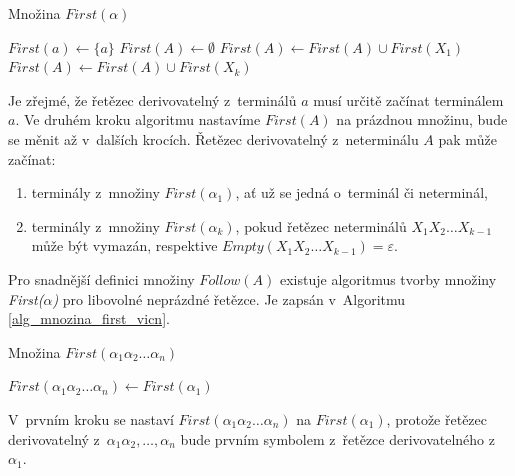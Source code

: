 \begin{algorithm}[ht]
    \caption{Množina $First(\alpha)$}
    \label{alg_mnozina_first}
    \begin{algorithmic}[1]
        \NewLine
            \State $First(a) \gets \{a\}$
        \EndFor
            \State $First(A) \gets \emptyset$
        \EndFor
                \State $First(A) \gets First(A) \cup First(X_1)$
                    \State $First(A) \gets First(A) \cup First(X_k)$ 
                \EndIf
            \EndIf
        \EndWhile
    \end{algorithmic}
\end{algorithm}
Je zřejmé, že řetězec derivovatelný z~terminálů $a$ musí určitě začínat terminálem $a$.
Ve druhém kroku algoritmu nastavíme $First(A)$ na prázdnou množinu, bude se měnit až v~dalších krocích.
Řetězec derivovatelný z~neterminálu $A$ pak může začínat:
\begin{enumerate}
    \item terminály z~množiny $First(\alpha_1)$, ať už se jedná o~terminál či neterminál,
    \item terminály z~množiny $First(\alpha_k)$, pokud řetězec neterminálů $X_1X_2\ldots X_{k-1}$ může být vymazán, respektive $Empty(X_1X_2\ldots X_{k-1}) = \varepsilon$.  
\end{enumerate}

Pro snadnější definici množiny $Follow(A)$ existuje algoritmus tvorby množiny \emph{First($\alpha$)} pro libovolné neprázdné řetězce.
Je zapsán v~Algoritmu \ref{alg_mnozina_first_vicn}.
\begin{algorithm}
    \caption{Množina $First(\alpha_1\alpha_2\ldots\alpha_n)$}
    \label{alg_mnozina_first_vicn}
    \begin{algorithmic}[1]
        \NewLine
        \State $First(\alpha_1\alpha_2\ldots \alpha_n) \gets First(\alpha_1)$
    \end{algorithmic}
\end{algorithm}
V~prvním kroku se nastaví $First(\alpha_1\alpha_2\ldots \alpha_n)$ na $First(\alpha_1)$, protože řetězec derivovatelný z~$\alpha_1\alpha_2,\ldots,\alpha_n$ bude prvním symbolem z~řetězce derivovatelného z~$\alpha_1$.

